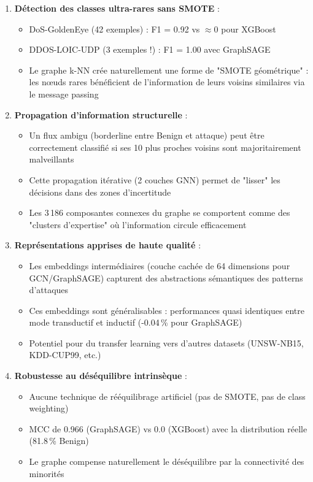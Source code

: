 ﻿\documentclass[11pt,a4paper]{article}
\begin{document}
\begin{enumerate}
    \item \textbf{Détection des classes ultra-rares sans SMOTE} : 
\begin{itemize}
        \item DoS-GoldenEye (42 exemples) : F1 = 0.92 vs $\approx$0 pour XGBoost
        \item DDOS-LOIC-UDP (3 exemples !) : F1 = 1.00 avec GraphSAGE
        \item Le graphe k-NN crée naturellement une forme de "SMOTE géométrique" : les nœuds rares bénéficient de l'information de leurs voisins similaires via le message passing
\end{itemize}

    \item \textbf{Propagation d'information structurelle} :
    \begin{itemize}
        \item Un flux ambigu (borderline entre Benign et attaque) peut être correctement classifié si ses 10 plus proches voisins sont majoritairement malveillants
        \item Cette propagation itérative (2 couches GNN) permet de "lisser" les décisions dans des zones d'incertitude
        \item Les 3\,186 composantes connexes du graphe se comportent comme des "clusters d'expertise" où l'information circule efficacement
    \end{itemize}
    
    \item \textbf{Représentations apprises de haute qualité} :
    \begin{itemize}
        \item Les embeddings intermédiaires (couche cachée de 64 dimensions pour GCN/GraphSAGE) capturent des abstractions sémantiques des patterns d'attaques
        \item Ces embeddings sont généralisables : performances quasi identiques entre mode transductif et inductif (-0.04\,\% pour GraphSAGE)
        \item Potentiel pour du transfer learning vers d'autres datasets (UNSW-NB15, KDD-CUP99, etc.)
    \end{itemize}
    
    \item \textbf{Robustesse au déséquilibre intrinsèque} :
\begin{itemize}
        \item Aucune technique de rééquilibrage artificiel (pas de SMOTE, pas de class weighting)
        \item MCC de 0.966 (GraphSAGE) vs 0.0 (XGBoost) avec la distribution réelle (81.8\,\% Benign)
        \item Le graphe compense naturellement le déséquilibre par la connectivité des minorités
\end{itemize}


\end{enumerate}
\end{document}
